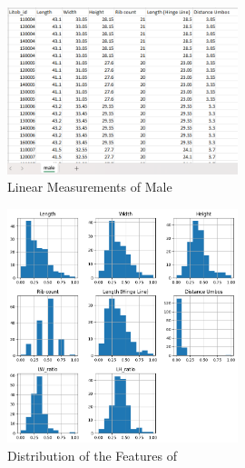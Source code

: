 \begin{figure}[!htbp]
	\centering
	\includegraphics[width=0.6\textwidth]{figures/male_dataset.png}
	\caption{Linear Measurements of Male \Tegillarcagranosa}
\end{figure}

\begin{figure}[!htbp]
	\centering
	\includegraphics[width=0.6\textwidth]{figures/sample_distribution.png}
	\caption{Distribution of the Features of \Tegillarcagranosa}
\end{figure}


